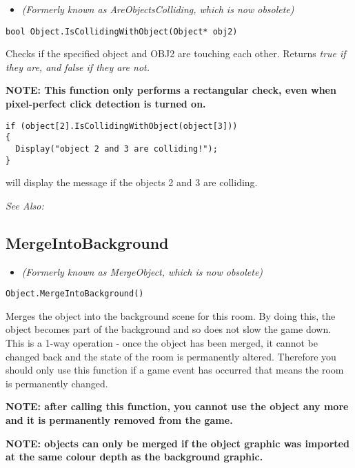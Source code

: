 \begin{itemize}
\item \it{(Formerly known as AreObjectsColliding, which is now obsolete)}
\end{itemize}

\begin{verbatim}
bool Object.IsCollidingWithObject(Object* obj2)
\end{verbatim}
Checks if the specified object and OBJ2 are touching each other. Returns \it{true} if they
are, and \it{false} if they are not.

\bf{NOTE:} This function only performs a rectangular check, even when pixel-perfect
click detection is turned on.

\begin{verbatim}
if (object[2].IsCollidingWithObject(object[3]))
{
  Display("object 2 and 3 are colliding!");
}
\end{verbatim}
will display the message if the objects 2 and 3 are colliding.

\it{See Also:} 


\subsection{MergeIntoBackground}\label{Object.MergeIntoBackground}%

\begin{itemize}
\item \it{(Formerly known as MergeObject, which is now obsolete)}
\end{itemize}

\begin{verbatim}
Object.MergeIntoBackground()
\end{verbatim}
Merges the object into the background scene for this room.
By doing this, the object becomes part of the background and so does not
slow the game down. This is a 1-way operation - once the object has
been merged, it cannot be changed back and the state of the room is
permanently altered. Therefore you should only use this function if a game
event has occurred that means the room is permanently changed.

\bf{NOTE:} after calling this function, you cannot use the object any more and
it is permanently removed from the game.

\bf{NOTE:} objects can only be merged if the object graphic was imported at
the same colour depth as the background graphic.

